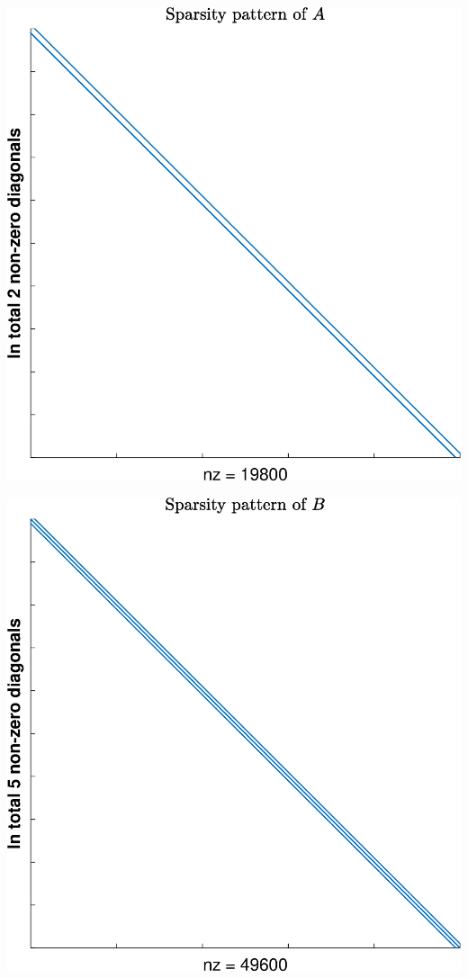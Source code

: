 \begin{minipage}[c][][c]{\linewidth}
\includegraphics[width=.95\columnwidth]{SparsityPatterns/SPP_1}
\end{minipage}
\begin{minipage}[c][][c]{\linewidth}
\includegraphics[width=.95\columnwidth]{SparsityPatterns/SPP_2}
\end{minipage}
